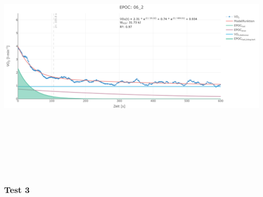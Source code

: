 \documentclass[
  letterpaper,
  DIV=11]{scrartcl}
\begin{document}
\includegraphics[width=11.45833in,height=4.6875in]{images/06_2.png}

\subsubsection{Test 3}
\end{document}
